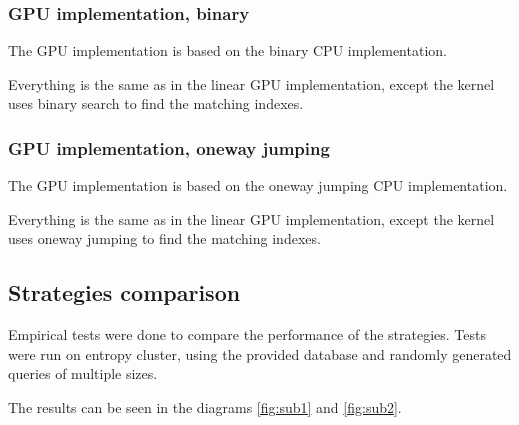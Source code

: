 \documentclass[a4paper,12pt]{article}
\begin{document}
    \subsubsection{GPU implementation, binary}

    The GPU implementation is based on the binary CPU implementation.

    Everything is the same as in the linear GPU implementation, except the kernel uses binary search to find the matching indexes.

    \subsubsection{GPU implementation, oneway jumping}

    The GPU implementation is based on the oneway jumping CPU implementation.

    Everything is the same as in the linear GPU implementation, except the kernel uses oneway jumping to find the matching indexes.

    \subsection{Strategies comparison}

    Empirical tests were done to compare the performance of the strategies.
    Tests were run on entropy cluster, using the provided database and randomly generated queries of multiple sizes.

    The results can be seen in the diagrams \ref{fig:sub1} and \ref{fig:sub2}.
\end{document}
